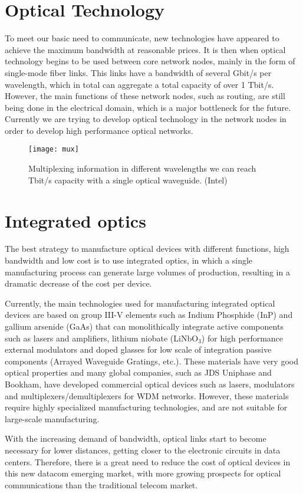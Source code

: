 \section{Optical Technology}
To meet our basic need to communicate, new technologies have appeared to achieve the maximum bandwidth at reasonable prices.
It is then when optical technology begins to be used between core network nodes, mainly in the form of single-mode fiber links.
This links have a bandwidth of several Gbit/s per wavelength, which in total can aggregate a total capacity of over 1 Tbit/s.
However, the main functions of these network nodes, such as routing, are still being done in the electrical domain, which is a major bottleneck for the future.
Currently we are trying to develop optical technology in the network nodes in order to develop high performance optical networks.


\begin{figure}[htb]
	\centering
	\texttt{[image: mux]}
	\caption{Multiplexing information in different wavelengths we can reach Tbit/s capacity with a single optical waveguide. (Intel)}
\end{figure}


\section{Integrated optics}
The best strategy to manufacture optical devices with different functions, high bandwidth and low cost is to use integrated optics, in which a single manufacturing process can generate large volumes of production, resulting in a dramatic decrease of the cost per device.

Currently, the main technologies used for manufacturing integrated optical devices are based on group III-V elements such as Indium Phosphide (InP) and gallium arsenide (GaAs) that can monolithically integrate active components such as lasers and amplifiers, lithium niobate ($ \mathrm{LiNbO_3} $) for high performance external modulators and doped glasses for low scale of integration passive components (Arrayed Waveguide Gratings, etc.).
These materials have very good optical properties and many global companies, such as JDS Uniphase and Bookham, have developed commercial optical devices such as lasers, modulators and multiplexers/demultiplexers for WDM networks. However, these materials require highly specialized manufacturing technologies, and are not suitable for large-scale manufacturing.

With the increasing demand of bandwidth, optical links start to become necessary for lower distances, getting closer to the electronic circuits in data centers. Therefore, there is a great need to reduce the cost of optical devices in this new datacom emerging market, with more growing prospects for optical communications than the traditional telecom market.


